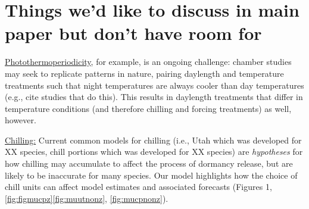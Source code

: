 \documentclass{article}
\begin{document}
\section*{Things we'd like to discuss in main paper but don't have room for}

\par \underline{Photothermoperiodicity}, for example, is an ongoing challenge: chamber studies may seek to replicate patterns in nature, pairing daylength and temperature treatments such that night temperatures are always cooler than day temperatures (e.g., cite studies that do this).  This results in daylength treatments that differ in temperature conditions (and therefore chilling and forcing treatments) as well, however.  

\par \underline{Chilling:} Current common models for chilling (i.e., Utah which was developed for XX species,  chill portions which was developed for XX species) are \emph{hypotheses} for how chilling may accumulate to affect the process of dormancy release, but are likely to be inaccurate for many species. Our model highlights how the choice of chill units can affect model estimates and associated forecasts (Figures 1,\ref{fig:figmucpz}\ref{fig:muutnonz}, \ref{fig:mucpnonz}). 




\newpage
\end{document}
